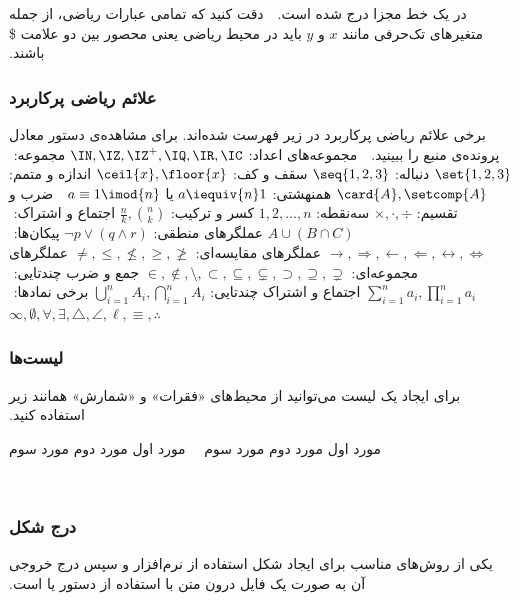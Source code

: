 ‫
‫در یک خط مجزا درج شده است.
‫%
‫%
‫دقت کنید که تمامی عبارات ریاضی، از جمله متغیرهای تک‌حرفی مانند $x$ و $y$ باید در محیط ریاضی یعنی محصور بین دو علامت \$ باشند.
‫
‫
‫\subsubsection{علائم ریاضی پرکاربرد}
‫
‫برخی علائم ریاضی پرکاربرد در زیر فهرست شده‌اند.
‫برای مشاهده‌ی دستور  معادل پرونده‌ی منبع را ببینید.
‫
‫
‫ مجموعه‌های اعداد:
‫$\IN, \IZ, \IZ^+, \IQ, \IR, \IC$
‫ مجموعه:
‫$\set{1, 2, 3}$
‫ دنباله‌:
‫$\seq{1, 2, 3}$
‫ سقف و کف:
‫$\ceil{x}, \floor{x}$
‫ اندازه و متمم:
‫$\card{A}, \setcomp{A}$
‫ همنهشتی:
‫$a \iequiv{n} 1$
‫یا
‫$a \equiv 1 \imod{n}$
‫%
‫%
‫ ضرب و تقسیم:
‫$\times, \cdot, \div$
‫ سه‌نقطه‌:
‫$1, 2, \dots, n$
‫ کسر و ترکیب:
‫${\frac{n}{k}}, {n \choose k}$
‫ اجتماع و اشتراک:
‫$A \cup (B \cap C)$
‫ عملگرهای منطقی:
‫$\neg p \vee (q \wedge r)$
‫
‫ پیکان‌ها:
‫$\rightarrow, \Rightarrow, \leftarrow, \Leftarrow, \leftrightarrow, \Leftrightarrow$
‫ عملگرهای مقایسه‌ای:
‫$\not=, \le, \not\le, \ge, \not\ge$
‫ عملگرهای مجموعه‌ای:
‫$\in, \not\in, \setminus, \subset, \subseteq, \subsetneq, \supset, \supseteq, \supsetneq$
‫
‫ جمع و ضرب چندتایی:
‫$\sum_{i=1}^{n} a_i, \prod_{i=1}^{n} a_i$
‫ اجتماع و اشتراک چندتایی:
‫$\bigcup_{i=1}^{n} A_i, \bigcap_{i=1}^{n} A_i$
‫ برخی نمادها:
‫$\infty, \emptyset, \forall, \exists, \triangle, \angle, \ell, \equiv, \therefore$
‫
‫
‫
‫
‫\subsubsection{لیست‌ها}
‫
‫برای ایجاد یک لیست‌ می‌توانید از محیط‌های «فقرات» و «شمارش» همانند زیر استفاده کنید.
‫
‫\begin{multicols}{2}
‫
‫ مورد اول
‫ مورد دوم
‫ مورد سوم
‫
‫
‫
‫ مورد اول
‫ مورد دوم
‫ مورد سوم
‫
‫
‫\end{multicols}
‫
‫
‫\subsubsection{درج شکل}
‫
‫یکی از روش‌های مناسب برای ایجاد شکل استفاده از نرم‌افزار  و سپس
‫درج خروجی آن به صورت یک فایل  درون متن
‫با استفاده از دستور   یا  است.
